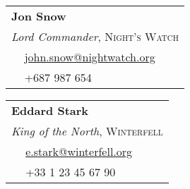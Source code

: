 %
%
%
\newcommand*\referee[5]{
  \hspace{1em}
  \begin{minipage}[t]{\dimexpr(\linewidth/3) - 3em}
    \begin{tabular}{>{}l >{}l}
      \multicolumn{2}{l}{\textbf{#1}}\\
      \multicolumn{2}{l}{\emph{#2}, \textsc{#3}}\\
      \quad \mailSymbol & \href{mailto:#4}{#4} \\  
      \quad \faPhone & #5 \\
    \end{tabular}
  \end{minipage}%
}


\referee
	{Jon Snow}
	{Lord Commander}
	{Night's Watch}
	{john.snow@nightwatch.org}
	{+687 987 654}
\referee
	{Eddard Stark}
	{King of the North}
	{Winterfell}
	{e.stark@winterfell.org}
	{+33 1 23 45 67 90}
\hfill
\bigskip
